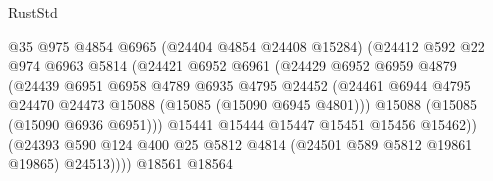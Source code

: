 \begin{lexlean}{RustStd}
\begin{coremodule}
                                      @35
                                      @975
                                      @4854
                                      @6965
                                      (@24404 @4854 @24408 @15284)
                                      (@24412
                                        @592
                                        @22
                                        @974
                                        @6963
                                        @5814
                                        (@24421
                                          @6952
                                          @6961
                                          (@24429
                                            @6952
                                            @6959
                                            @4879
                                            (@24439
                                              @6951
                                              @6958
                                              @4789
                                              @6935
                                              @4795
                                              @24452
                                              (@24461
                                                @6944
                                                @4795
                                                @24470
                                                @24473
                                                @15088
                                                (@15085 (@15090 @6945 @4801)))
                                              @15088
                                              (@15085 (@15090 @6936 @6951)))
                                            @15441
                                            @15444
                                            @15447
                                            @15451
                                            @15456
                                            @15462))
                                        (@24393
                                          @590
                                          @124
                                          @400
                                          @25
                                          @5812
                                          @4814
                                          (@24501 @589 @5812 @19861 @19865)
                                          @24513))))
                                  @18561
                                  @18564

\end{coremodule}
\end{lexlean}
